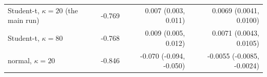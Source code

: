 \begin{tabular}{lrrr}
Student-t, $\kappa = 20$ (the main run) & -0.769 & 0.007 (0.003, 0.011) & 0.0069 (0.0041, 0.0100) \\
Student-t, $\kappa = 80$ & -0.768 & 0.009 (0.005, 0.012) & 0.0071 (0.0043, 0.0105) \\
normal, $\kappa = 20$ & -0.846 & -0.070 (-0.094, -0.050) & -0.0055 (-0.0085, -0.0024) \\
\bottomrule
\end{tabular}
